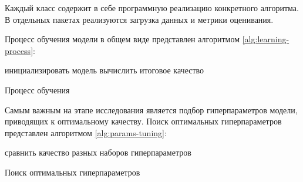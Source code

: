 Каждый класс содержит в себе программную реализацию конкретного алгоритма.
В отдельных пакетах реализуются загрузка данных и метрики оценивания.

Процесс обучения модели в общем виде представлен алгоритмом \ref{alg:learning-process}:

\vspace{1em}
\begin{algorithm}[H]
 \SetAlgoLined
 инициализировать модель\;
 вычислить итоговое качество\;
 \caption{Процесс обучения}\label{alg:learning-process}
\end{algorithm}

\vspace{1em}
Самым важным на этапе исследования является подбор гиперпараметров модели, приводящих к оптимальному качеству.
Поиск оптимальных гиперпараметров представлен алгоритмом \ref{alg:params-tuning}:

\vspace{1em}
\begin{algorithm}[H]
 \SetAlgoLined
 сравнить качество разных наборов гиперпараметров\;
 \caption{Поиск оптимальных гиперпараметров}\label{alg:params-tuning}
\end{algorithm}
